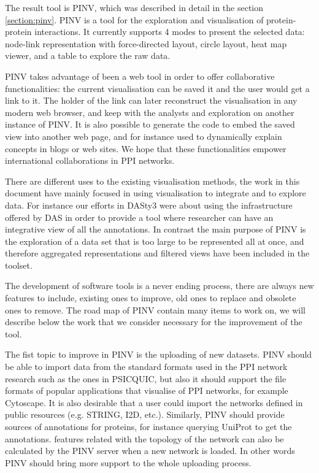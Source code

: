 The result tool is PINV, which was described in detail in the section \ref{section:pinv}. PINV is a tool for the exploration and visualisation of protein-protein interactions. It currently supports 4 modes to present the selected data: node-link representation with force-directed layout, circle layout, heat map viewer, and a table to explore the raw data. 

PINV takes advantage of been a web tool in order to offer collaborative functionalities: the current visualisation can be saved it and the user would  get a link to it. The holder of the link can later reconstruct the visualisation in any modern web browser, and keep with the analysts and exploration on another instance of PINV. It is also possible to generate the code to embed the saved view into another web page, and for instance used to dynamically explain concepts in blogs or web sites. We hope that these functionalities empower international collaborations in PPI networks.

There are different uses to the existing visualisation methods, the work in this document have mainly focused in using visualisation to integrate and to explore data. For instance our efforts in DASty3 were about using the infrastructure offered by DAS in order to provide a tool where researcher can have an integrative view of all the annotations. In contrast the main purpose of PINV is the exploration of a data set that is too large to be represented all at once, and therefore aggregated representations and filtered views have been included in the toolset.

The development of software tools is a never ending process, there are always new features to include, existing ones to improve, old ones to replace and obsolete ones to remove. The road map of PINV contain many items to work on, we will describe below the work that we consider necessary for the improvement of the tool.

The fist topic to improve in PINV is the uploading of new datasets. PINV should be able to import data from the standard formats used in the PPI network research such as the ones in PSICQUIC, but also it should support the file formats of popular applications that visualise of PPI networks, for example Cytoscape. It is also desirable that a user could import the networks defined in public resources (e.g. STRING, I2D, etc.). Similarly, PINV should provide sources of annotations for proteins, for instance querying UniProt to get the annotations. features related with the topology of the network can also be calculated by the PINV server when a new network is loaded. In other words PINV should bring more support to the whole uploading process.

